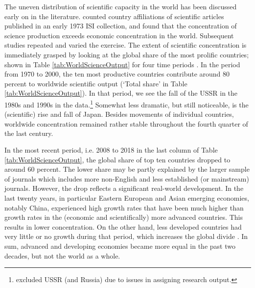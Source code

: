 The uneven distribution of scientific capacity in the world has been discussed early on in the literature. \cite{davidson1977distribution} counted country affiliations of scientific articles published in an early 1973 ISI collection, and found that the concentration of science production exceeds economic concentration in the world. Subsequent studies repeated and varied the exercise. The extent of scientific concentration is immediately grasped by looking at the global share of the most prolific countries; shown in Table \ref{tab:WorldScienceOutput} for four time periods \citep[based on][]{davidson1977distribution,may1997scientific,king2004scientific,allik2020factors}. In the period from 1970 to 2000, the ten most productive countries contribute around 80 percent to worldwide scientific output (`Total share' in Table \ref{tab:WorldScienceOutput}). In that period, we see the fall of the USSR in the 1980s and 1990s in the data.\footnote{\cite{may1997scientific} excluded USSR (and Russia) due to issues in assigning research output.} Somewhat less dramatic, but still noticeable, is the (scientific) rise and fall of Japan. Besides movements of individual countries, worldwide concentration remained rather stable throughout the fourth quarter of the last century.  

   


In the most recent period, i.e. 2008 to 2018 in the last column of Table \ref{tab:WorldScienceOutput}, the global share of top ten countries dropped to around 60 percent. The lower share may be partly explained by the larger sample of journals which includes more non-English and less established (or mainstream) journals. However, the drop reflects a significant real-world development. In the last twenty years, in particular Eastern European and Asian emerging economies, notably China, experienced high growth rates that have been much higher than growth rates in the (economic and scientifically) more advanced countries\citep{horlings2011convergence}. This results in lower concentration. On the other hand, less developed countries had very little or no growth during that period, which increases the global divide \citep{horlings2011convergence}. In sum, advanced and developing economies became more equal in the past two decades, but not the world as a whole.

